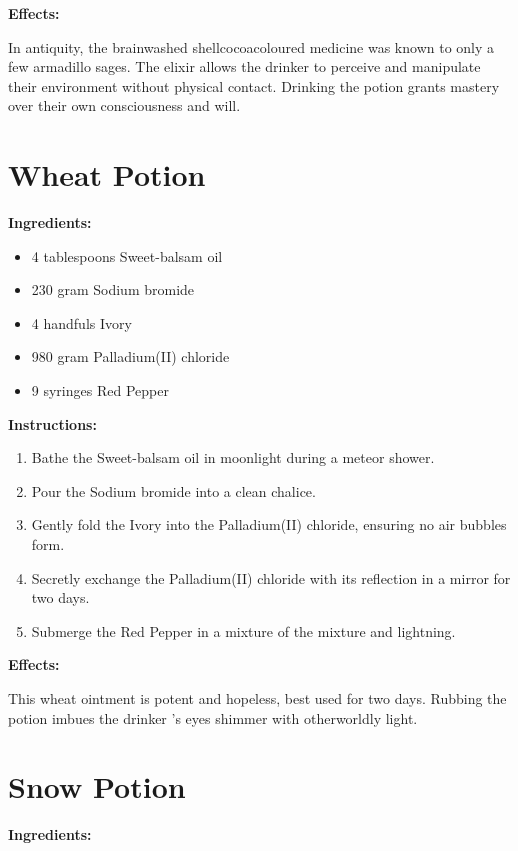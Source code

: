\documentclass{article}
\begin{document}
\textbf{Effects:}

In antiquity, the brainwashed shellcocoacoloured medicine was known to only a few armadillo sages. The elixir allows the drinker to perceive and manipulate their environment without physical contact. Drinking the potion grants mastery over their own consciousness and will.

\newpage
\section*{Wheat Potion}

\textbf{Ingredients:}

\begin{itemize}
  \item 4 tablespoons Sweet-balsam oil
  \item 230 gram Sodium bromide
  \item 4 handfuls Ivory
  \item 980 gram Palladium(II) chloride
  \item 9 syringes Red Pepper
\end{itemize}

\textbf{Instructions:}

\begin{enumerate}
  \item Bathe the Sweet-balsam oil in moonlight during a meteor shower.
  \item Pour the Sodium bromide into a clean chalice.
  \item Gently fold the Ivory into the Palladium(II) chloride, ensuring no air bubbles form.
  \item Secretly exchange the Palladium(II) chloride with its reflection in a mirror for two days.
  \item Submerge the Red Pepper in a mixture of the mixture and lightning.
\end{enumerate}

\textbf{Effects:}

This wheat ointment is potent and hopeless, best used for two days. Rubbing the potion imbues the drinker 's eyes shimmer with otherworldly light.

\newpage
\section*{Snow Potion}

\textbf{Ingredients:}
\end{document}
